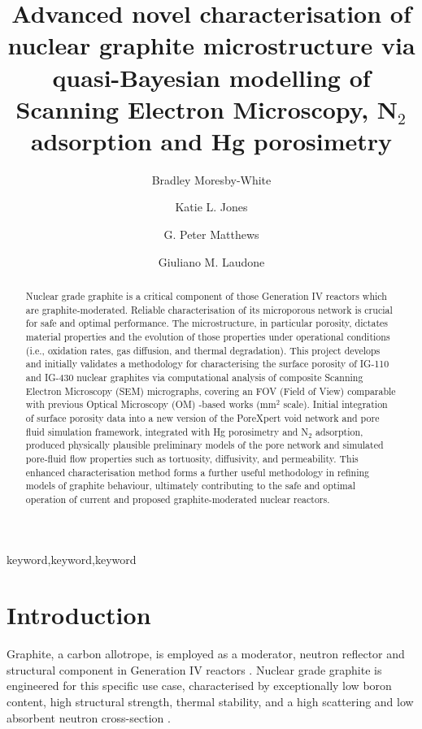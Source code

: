\documentclass[review]{elsarticle}
\begin{document}
\begin{frontmatter}
\title{Advanced novel characterisation of nuclear graphite microstructure via quasi-Bayesian modelling of Scanning Electron Microscopy, N$_2$ adsorption and Hg porosimetry}
\author[plym]{Bradley Moresby-White}
\author[plym]{Katie L. Jones}
\author[plym]{G. Peter Matthews}
\author[plym]{Giuliano M. Laudone}
\address[plym]{Faculty of Science and Engineering, University of Plymouth, Plymouth, UK}
\begin{abstract}
Nuclear grade graphite is a critical component of those Generation IV reactors
which are graphite-moderated. Reliable characterisation of its microporous
network is crucial for safe and optimal performance. The microstructure, in
particular porosity, dictates material properties and the evolution of those
properties under operational conditions (i.e., oxidation rates, gas diffusion,
and thermal degradation). This project develops and initially validates a
methodology for characterising the surface porosity of IG-110 and IG-430 nuclear
graphites via computational analysis of composite Scanning Electron Microscopy
(SEM) micrographs, covering an FOV (Field of View) comparable with previous
Optical Microscopy (OM) -based works (mm\(^2\) scale). Initial integration of
surface porosity data into a new version of the PoreXpert void network and pore
fluid simulation framework, integrated with Hg porosimetry and N$_2$ adsorption,
produced physically plausible preliminary models of the pore network and
simulated pore-fluid flow properties such as tortuosity, diffusivity, and
permeability. This enhanced characterisation method forms a further useful
methodology in refining models of graphite behaviour, ultimately contributing to
the safe and optimal operation of current and proposed graphite-moderated
nuclear reactors.
\end{abstract}
\begin{keyword}keyword\sep keyword\sep keyword\end{keyword}
\end{frontmatter}

\section{Introduction}
Graphite, a carbon allotrope, is employed as a moderator, neutron reflector and
structural component in Generation IV reactors \citep{MARSDENgeniv}. Nuclear
grade graphite is engineered for this specific use case, characterised by
exceptionally low boron content, high structural strength, thermal stability,
and a high scattering and low absorbent neutron cross-section
\citep{Marsden2016}. 
\end{document}
